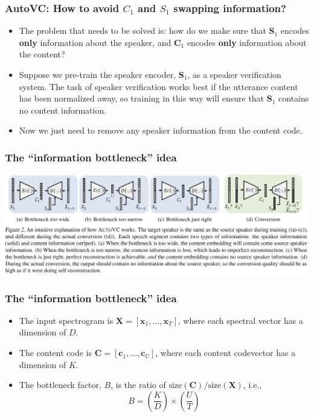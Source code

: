\documentclass{beamer}
\begin{document}
\begin{frame}
  \frametitle{AutoVC: How to avoid $C_1$ and $S_1$ swapping information?}

  \begin{itemize}
  \item The problem that needs to be solved is: how do we make sure
    that $\bm{S}_1$ encodes \textbf{only} information about the
    speaker, and $\bm{C}_1$ encodes \textbf{only} information about
    the content?
  \item Suppose we pre-train the speaker encoder, $\bm{S}_1$, as a
    speaker verification system.  The task of speaker verification
    works best if the utterance content has been normalized away, so
    training in this way will ensure that $\bm{S}_1$ contains no
    content information.
  \item Now we just need to remove any speaker information from the
    content code.
  \end{itemize}
\end{frame}

\begin{frame}
  \frametitle{The ``information bottleneck'' idea}

  \centerline{\includegraphics[width=1.1\textwidth]{figs/qianfig2.png}}
\end{frame}


\begin{frame}
  \frametitle{The ``information bottleneck'' idea}

  \begin{itemize}
  \item The input spectrogram is $\bm{X}=[\bm{x}_1,\ldots,\bm{x}_T]$,
    where each spectral vector has a dimension of $D$.
  \item The content code is $\bm{C}=[\bm{c}_1,\ldots,\bm{c}_U]$, where each
    content codevector has a dimension of $K$.
  \item The bottleneck factor, $B$, is the ratio of
    $\text{size}(\bm{C})/\text{size}(\bm{X})$, i.e.,
    \begin{displaymath}
      B = \left(\frac{K}{D}\right)\times\left(\frac{U}{T}\right)
    \end{displaymath}
  \end{itemize}
\end{frame}
\end{document}
